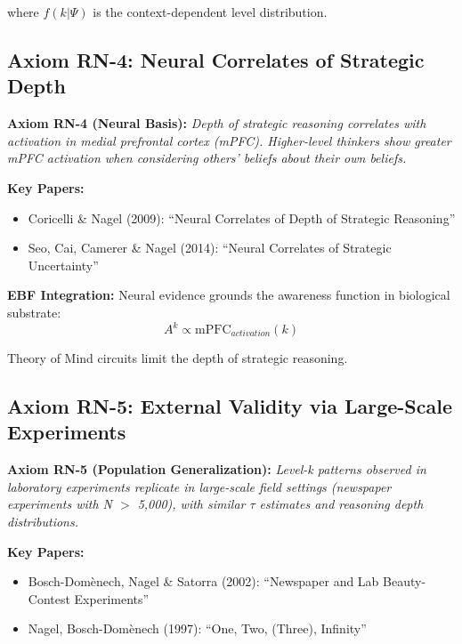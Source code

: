where $f(k|\Psi)$ is the context-dependent level distribution.

\subsection{Axiom RN-4: Neural Correlates of Strategic Depth}

\begin{tcolorbox}[colback=blue!5!white, colframe=blue!75!black]
\textbf{Axiom RN-4 (Neural Basis):}
\textit{Depth of strategic reasoning correlates with activation in medial prefrontal cortex (mPFC). Higher-level thinkers show greater mPFC activation when considering others' beliefs about their own beliefs.}
\end{tcolorbox}

\textbf{Key Papers:}
\begin{itemize}[nosep]
    \item Coricelli \& Nagel (2009): ``Neural Correlates of Depth of Strategic Reasoning''
    \item Seo, Cai, Camerer \& Nagel (2014): ``Neural Correlates of Strategic Uncertainty''
\end{itemize}

\textbf{EBF Integration:}
Neural evidence grounds the awareness function in biological substrate:
\begin{equation}
A^k \propto \text{mPFC}_{activation}(k)
\end{equation}

Theory of Mind circuits limit the depth of strategic reasoning.

\subsection{Axiom RN-5: External Validity via Large-Scale Experiments}

\begin{tcolorbox}[colback=blue!5!white, colframe=blue!75!black]
\textbf{Axiom RN-5 (Population Generalization):}
\textit{Level-k patterns observed in laboratory experiments replicate in large-scale field settings (newspaper experiments with N $>$ 5,000), with similar $\tau$ estimates and reasoning depth distributions.}
\end{tcolorbox}

\textbf{Key Papers:}
\begin{itemize}[nosep]
    \item Bosch-Dom\`{e}nech, Nagel \& Satorra (2002): ``Newspaper and Lab Beauty-Contest Experiments''
    \item Nagel, Bosch-Dom\`{e}nech (1997): ``One, Two, (Three), Infinity''
\end{itemize}

